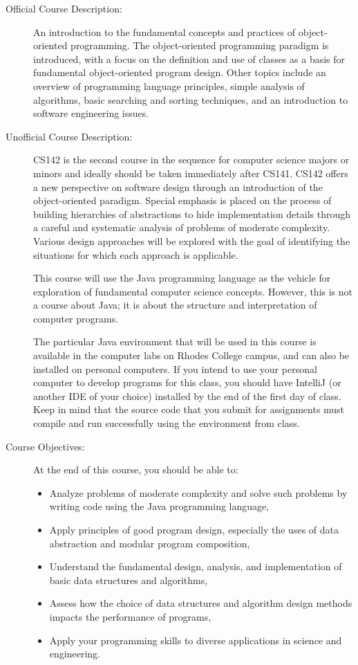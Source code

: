 \documentclass [letterpaper,11pt]{article}
\begin{document}
\begin{description}

\item[Official Course Description:]
An introduction to the fundamental concepts and practices of
object-oriented programming. The object-oriented programming paradigm is introduced,
with a focus on the definition and use of classes as a basis for fundamental object-oriented
program design. Other topics include an overview of programming language principles, simple
analysis of algorithms, basic searching and sorting techniques, and an introduction to
software engineering issues.

\item[Unofficial Course Description:]
CS142 is the second course in the sequence for computer science majors or minors and ideally should be taken immediately after CS141. CS142 offers a new perspective on software design through an introduction of the object-oriented paradigm. Special emphasis is placed on the process of building hierarchies of abstractions to hide implementation details through a careful and systematic analysis of problems of moderate complexity. Various design approaches will be explored with the goal of identifying the situations for which each approach is applicable. 

This course will use the Java programming language as the vehicle for exploration of fundamental computer science concepts. However, this is not a course about Java; it is about the structure and interpretation of computer programs.

The particular Java environment that will be used in this course is available in the computer labs on Rhodes College campus, 
and can also be installed on personal computers.  If you intend to use your personal computer to develop programs for this class, you should have IntelliJ (or another IDE of your choice) installed by the end of the first day of class.
Keep in mind that the source code that you submit for assignments must compile and run successfully using the environment from class.

\item[Course Objectives:]
At the end of this course, you should be able to:
\begin{itemize} \setlength{\itemsep}{0em}\setlength{\parskip}{0pt}
	\item Analyze problems of moderate complexity and solve such problems by writing code using the Java programming language,
	\item Apply principles of good program design, especially the uses of data abstraction and modular program composition,
	\item Understand the fundamental design, analysis, and implementation of basic data structures and algorithms,
	\item Assess how the choice of data structures and algorithm design methods impacts the performance of programs,
	\item Apply your programming skills to diverse applications in science and engineering.
\end{itemize}




\end{description}
\end{document}
